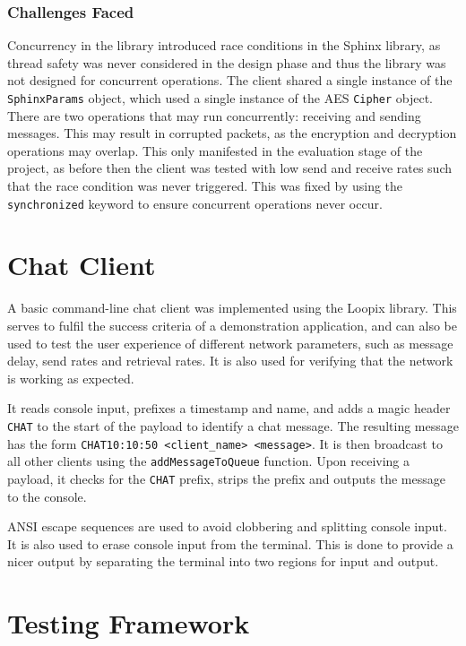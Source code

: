 \documentclass[final,dissertation.tex]{subfiles}
\begin{document}
\subsubsection{Challenges Faced}

Concurrency in the library introduced race conditions in the Sphinx library, as thread safety was never considered in the design phase and thus the library was not designed for concurrent operations. The client shared a single instance of the \verb|SphinxParams| object, which used a single instance of the AES \verb|Cipher| object. There are two operations that may run concurrently: receiving and sending messages. This may result in corrupted packets, as the encryption and decryption operations may overlap. This only manifested in the evaluation stage of the project, as before then the client was tested with low send and receive rates such that the race condition was never triggered. This was fixed by using the \verb|synchronized| keyword to ensure concurrent operations never occur.

\section{Chat Client}

A basic command-line chat client was implemented using the Loopix library. This serves to fulfil the success criteria of a demonstration application, and can also be used to test the user experience of different network parameters, such as message delay, send rates and retrieval rates. It is also used for verifying that the network is working as expected.

It reads console input, prefixes a timestamp and name, and adds a magic header \verb|CHAT| to the start of the payload to identify a chat message. The resulting message has the form \verb|CHAT10:10:50 <client_name> <message>|. It is then broadcast to all other clients using the \verb|addMessageToQueue| function. Upon receiving a payload, it checks for the \verb|CHAT| prefix, strips the prefix and outputs the message to the console. 

ANSI escape sequences are used to avoid clobbering and splitting console input. It is also used to erase console input from the terminal. This is done to provide a nicer output by separating the terminal into two regions for input and output.

\section{Testing Framework}
\end{document}
